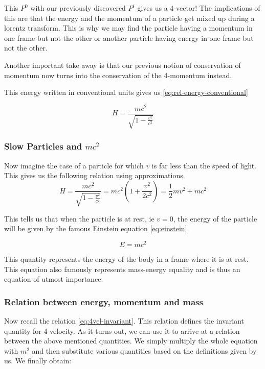 \documentclass[16pt]{scrartcl}
\numberwithin{equation}{section}
\theoremstyle{plain}
\theoremstyle{definition}
\begin{document}
This $P^0$ with our previously discovered $P^i$ gives us a 4-vector! The implications of this are that the energy and the momentum of a particle get mixed up during a lorentz transform. This is why
we may find the particle having a momentum in one frame but not the other or another particle having energy in one frame but not the other. 

Another important take away is that our previous notion of conservation of momentum now turns into the conservation of the 4-momentum instead.

This energy written in conventional units gives us \eqref{eq:rel-energy-conventional}

\begin{equation}
    H = \frac{mc^2}{\sqrt{1-\frac{v^2}{c^2}}}
    \label{eq:rel-energy-conventional}
\end{equation}

\subsubsection*{Slow Particles and $mc^2$}

Now imagine the case of a particle for which $v$ is far less than the speed of light. This gives us the following relation using approximations.
\begin{equation}
    H = \frac{mc^2}{\sqrt{1-\frac{v^2}{c^2}}} = mc^2 \left(1 + \frac{v^2}{2c^2} \right) = \frac{1}{2} mv^2 + mc^2
    \label{eq:rel-energy-slow}
\end{equation}

This tells us that when the particle is at rest, ie $v=0$, the energy of the particle will be given by the famous Einstein equation \eqref{eq:einstein}.

\begin{equation}
    E = mc^2
    \label{eq:einstein}
\end{equation}

This quantity represents the energy of the body in a frame where it is at rest. This equation also famously represents mass-energy equality and is thus an equation of utmost importance.

\subsubsection*{Relation between energy, momentum and mass}

Now recall the relation \eqref{eq:4vel-invariant}. This relation defines the invariant quantity for 4-velocity. As it turns out, we can use it to arrive at a relation between the above mentioned quantities. We simply multiply the whole equation with $m^2$ and then substitute various quantities based on the definitions given by us. We finally obtain:
\end{document}
